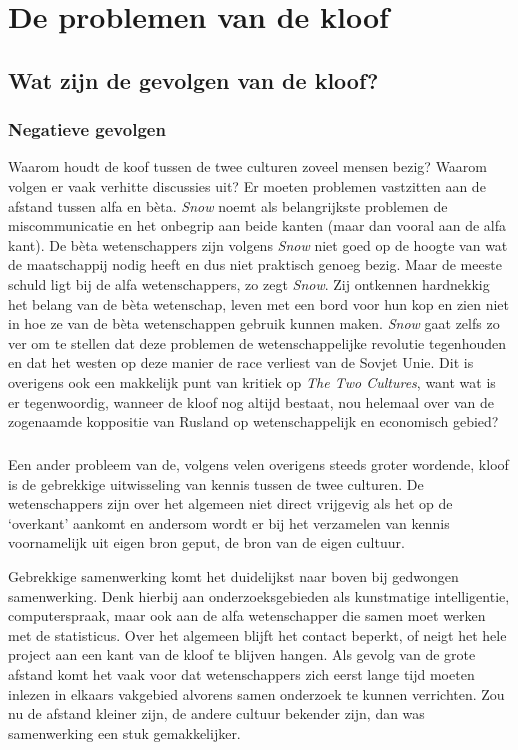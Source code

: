 \chapter{De problemen van de kloof}


\section{Wat zijn de gevolgen van de kloof?}


\subsection{Negatieve gevolgen}

Waarom houdt de koof tussen de twee culturen zoveel mensen bezig? Waarom volgen er vaak verhitte discussies uit? Er moeten problemen vastzitten aan de afstand tussen alfa en b\`eta. \emph{Snow} noemt als belangrijkste problemen de miscommunicatie en het onbegrip aan beide kanten (maar dan vooral aan de alfa kant). De b\`eta wetenschappers zijn volgens \emph{Snow} niet goed op de hoogte van wat de maatschappij nodig heeft en dus niet praktisch genoeg bezig. Maar de meeste schuld ligt bij de alfa wetenschappers, zo zegt \emph{Snow}. Zij ontkennen hardnekkig het belang van de b\`eta wetenschap, leven met een bord voor hun kop en zien niet in hoe ze van de b\`eta wetenschappen gebruik kunnen maken. \emph{Snow} gaat zelfs zo ver om te stellen dat deze problemen de wetenschappelijke revolutie tegenhouden en dat het westen op deze manier de race verliest van de Sovjet Unie. Dit is overigens ook een makkelijk punt van kritiek op \emph{The Two Cultures}, want wat is er tegenwoordig, wanneer de kloof nog altijd bestaat, nou helemaal over van de zogenaamde koppositie van Rusland op wetenschappelijk en economisch gebied?

\paragraph{}

Een ander probleem van de, volgens velen overigens steeds groter wordende, kloof is de gebrekkige uitwisseling van kennis tussen de twee culturen. De wetenschappers zijn over het algemeen niet direct vrijgevig als het op de `overkant' aankomt en andersom wordt er bij het verzamelen van kennis voornamelijk uit eigen bron geput, de bron van de eigen cultuur.

Gebrekkige samenwerking komt het duidelijkst naar boven bij gedwongen samenwerking. Denk hierbij aan onderzoeksgebieden als kunstmatige intelligentie, computerspraak, maar ook aan de alfa wetenschapper die samen moet werken met de statisticus. Over het algemeen blijft het contact beperkt, of neigt het hele project aan een kant van de kloof te blijven hangen. Als gevolg van de grote afstand komt het vaak voor dat wetenschappers zich eerst lange tijd moeten inlezen in elkaars vakgebied alvorens samen onderzoek te kunnen verrichten. Zou nu de afstand kleiner zijn, de andere cultuur bekender zijn, dan was samenwerking een stuk gemakkelijker.


